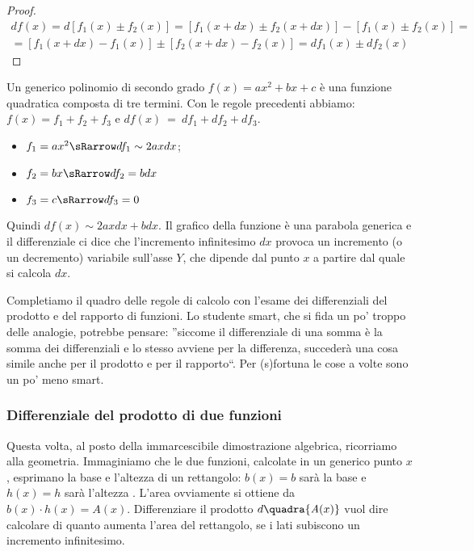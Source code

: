 \begin{proof}
\begin{align*}
 df(x)=d[f_1(x)\pm f_2(x)]=[f_1(x+dx)\pm f_2(x+dx)]-[f_1(x)\pm f_2(x)]=\\
 = [f_1(x+dx)-f_1(x)]\pm [f_2(x+dx)-f_2(x)]= df_1(x)\pm df_2(x)
\end{align*}
\end{proof}

\begin{esempio}
 Un generico polinomio di secondo grado \(f(x)=ax^2+bx+c\) è una
 funzione quadratica composta di tre termini. 
 Con le regole precedenti abbiamo: \(f(x)=f_1+f_2+f_3\) e
 \(df(x)~=~df_1+df_2+df_3\).
 \begin{itemize} [noitemsep]
  \item $f_1=ax^2 \sRarrow df_1\sim 2axdx$; 
  \item $f_2=bx \sRarrow df_2=bdx$
  \item $f_3=c \sRarrow df_3=0$
 \end{itemize}
Quindi $df(x)\sim 2axdx+bdx$. Il grafico della funzione è una parabola 
generica
e il differenziale ci dice che l'incremento infinitesimo 
$dx$ provoca un incremento (o un decremento) variabile sull'asse $Y$, che 
dipende dal punto $x$ a partire dal quale si calcola $dx$.
\end{esempio}

Completiamo il quadro delle regole di calcolo con l'esame dei differenziali
del prodotto e del rapporto di funzioni. Lo studente smart, che si fida un 
po' 
troppo delle analogie, potrebbe pensare: ''siccome il differenziale di una 
somma è la somma dei differenziali e lo stesso avviene per la differenza, 
succederà una cosa simile anche per il prodotto e per il rapporto``. 
Per (s)fortuna le cose a volte sono un po' meno smart.

\subsubsection{Differenziale del prodotto di due funzioni}
\label{}
Questa volta, al posto della immarcescibile dimostrazione algebrica, 
ricorriamo
alla geometria. Immaginiamo che le due funzioni, calcolate in un generico 
punto $x$,
esprimano la base e l'altezza di un rettangolo:
$b(x)=b$ sarà la base  e $h(x)=h$ sarà l'altezza . L'area ovviamente
si ottiene da $b(x)\cdot h(x)=\mathit{A}(x)$. 
Differenziare il prodotto $d\quadra{\mathit{A}(x)}$ vuol dire calcolare di
quanto aumenta l'area del rettangolo, se i lati subiscono un incremento 
infinitesimo. 


